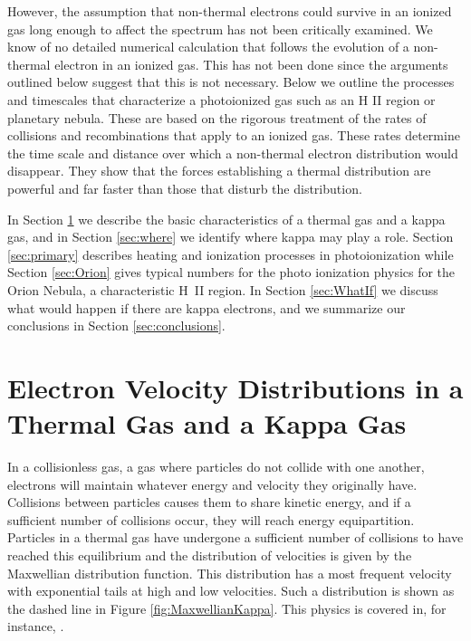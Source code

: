 \documentclass[debug, preprint, twocolumn]{rmaa}
\begin{document}
However, the  assumption that non-thermal electrons 
could survive in an ionized gas long enough to affect the spectrum  
has not been critically examined.
We know of no detailed numerical calculation that follows the evolution of a 
non-thermal electron in an ionized gas. 
This has not been done since the arguments outlined below suggest that this is not necessary. 
Below we outline the processes and timescales that characterize a photoionized gas such 
as an H II region or planetary nebula.  
These are based on the rigorous treatment of the rates of collisions and recombinations 
that apply to an  ionized gas.
These rates determine the time scale and distance over which a non-thermal 
electron distribution would disappear.
They show that the forces establishing a thermal distribution are powerful and 
far faster than those that disturb the distribution.

In Section \ref{sec:ThermalAndKappa} we describe the basic characteristics of 
a thermal gas and a kappa gas, and in Section \ref{sec:where} we identify where kappa may play a role.
Section \ref{sec:primary} describes heating and ionization processes in photoionization
while Section \ref{sec:Orion}  gives typical numbers for the photo ionization physics 
for the Orion Nebula, a characteristic H~II region. 
In Section \ref{sec:WhatIf} we discuss what would happen if there are kappa electrons, 
and we summarize our conclusions in Section \ref{sec:conclusions}.

\section{Electron Velocity Distributions in a Thermal Gas and a Kappa Gas}
\label{sec:ThermalAndKappa}

In a collisionless gas, a gas where particles do not collide with one another,
electrons will maintain whatever energy and velocity they originally have.
Collisions between particles causes them to share kinetic energy, and if a sufficient number
of collisions occur, they will reach energy equipartition.
Particles in a thermal gas have undergone a sufficient number of collisions to have reached this equilibrium
and the distribution of velocities is  given by the Maxwellian distribution function. 
This distribution has a most frequent velocity with exponential tails at high and low velocities. 
Such a distribution is shown as the dashed line in Figure \ref{fig:MaxwellianKappa}.
This physics is covered in, for instance, \citet{Spitzer1962}.
\end{document}
